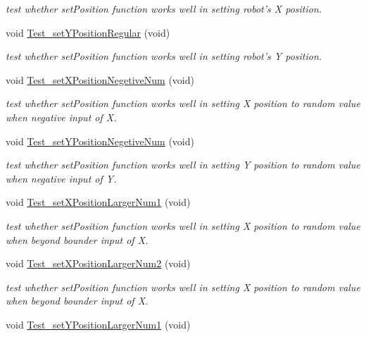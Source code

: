 \begin{DoxyCompactItemize}
\begin{DoxyCompactList}\small\item\em test whether set\-Position function works well in setting robot's X position. \end{DoxyCompactList}\item 
void \hyperlink{classObjectTests_adefdeada43ea50fe1b0334bedc7400c7}{Test\-\_\-set\-Y\-Position\-Regular} (void)
\begin{DoxyCompactList}\small\item\em test whether set\-Position function works well in setting robot's Y position. \end{DoxyCompactList}\item 
void \hyperlink{classObjectTests_a56da3c8ba84487866849205cdc3ca014}{Test\-\_\-set\-X\-Position\-Negetive\-Num} (void)
\begin{DoxyCompactList}\small\item\em test whether set\-Position function works well in setting X position to random value when negative input of X. \end{DoxyCompactList}\item 
void \hyperlink{classObjectTests_a7ccdbab9e0a7fc65c68f962062a6fd0f}{Test\-\_\-set\-Y\-Position\-Negetive\-Num} (void)
\begin{DoxyCompactList}\small\item\em test whether set\-Position function works well in setting Y position to random value when negative input of Y. \end{DoxyCompactList}\item 
void \hyperlink{classObjectTests_acfe64542be015eb777ad8f6e17bfa8c7}{Test\-\_\-set\-X\-Position\-Larger\-Num1} (void)
\begin{DoxyCompactList}\small\item\em test whether set\-Position function works well in setting X position to random value when beyond bounder input of X. \end{DoxyCompactList}\item 
void \hyperlink{classObjectTests_aaee0a0fad26b5bebfce14ff81d2b186c}{Test\-\_\-set\-X\-Position\-Larger\-Num2} (void)
\begin{DoxyCompactList}\small\item\em test whether set\-Position function works well in setting X position to random value when beyond bounder input of X. \end{DoxyCompactList}\item 
void \hyperlink{classObjectTests_a9aabec99604e89967320e7ba85a5be38}{Test\-\_\-set\-Y\-Position\-Larger\-Num1} (void)

\end{DoxyCompactItemize}

